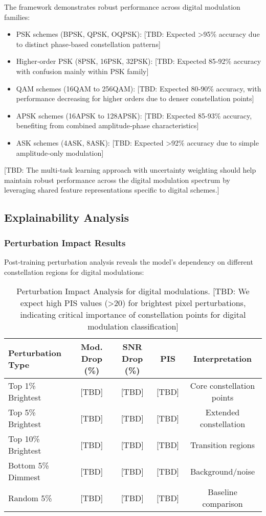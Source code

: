 \documentclass{ELSP}
\begin{document}
The framework demonstrates robust performance across digital modulation families:
\begin{itemize}
\item PSK schemes (BPSK, QPSK, OQPSK): [TBD: Expected >95\% accuracy due to distinct phase‑based constellation patterns]
\item Higher‑order PSK (8PSK, 16PSK, 32PSK): [TBD: Expected 85‑92\% accuracy with confusion mainly within PSK family]
\item QAM schemes (16QAM to 256QAM): [TBD: Expected 80‑90\% accuracy, with performance decreasing for higher orders due to denser constellation points]
\item APSK schemes (16APSK to 128APSK): [TBD: Expected 85‑93\% accuracy, benefiting from combined amplitude‑phase characteristics]
\item ASK schemes (4ASK, 8ASK): [TBD: Expected >92\% accuracy due to simple amplitude‑only modulation]
\end{itemize}

[TBD: The multi‑task learning approach with uncertainty weighting should help maintain robust performance across the digital modulation spectrum by leveraging shared feature representations specific to digital schemes.]

\subsection{Explainability Analysis}

\subsubsection{Perturbation Impact Results}

Post‑training perturbation analysis reveals the model's dependency on different constellation regions for digital modulations:

\begin{table}[H]
\centering
\begin{tabular}{lcccc}
\toprule
\textbf{Perturbation Type} & \textbf{Mod. Drop (\%)} & \textbf{SNR Drop (\%)} & \textbf{PIS} & \textbf{Interpretation} \\
\midrule
Top 1\% Brightest & [TBD] & [TBD] & [TBD] & Core constellation points \\
Top 5\% Brightest & [TBD] & [TBD] & [TBD] & Extended constellation \\
Top 10\% Brightest & [TBD] & [TBD] & [TBD] & Transition regions \\
Bottom 5\% Dimmest & [TBD] & [TBD] & [TBD] & Background/noise \\
Random 5\% & [TBD] & [TBD] & [TBD] & Baseline comparison \\
\bottomrule
\end{tabular}
\caption{Perturbation Impact Analysis for digital modulations. [TBD: We expect high PIS values (>20) for brightest pixel perturbations, indicating critical importance of constellation points for digital modulation classification]}
\label{tab:perturbation}
\end{table}
\end{document}
